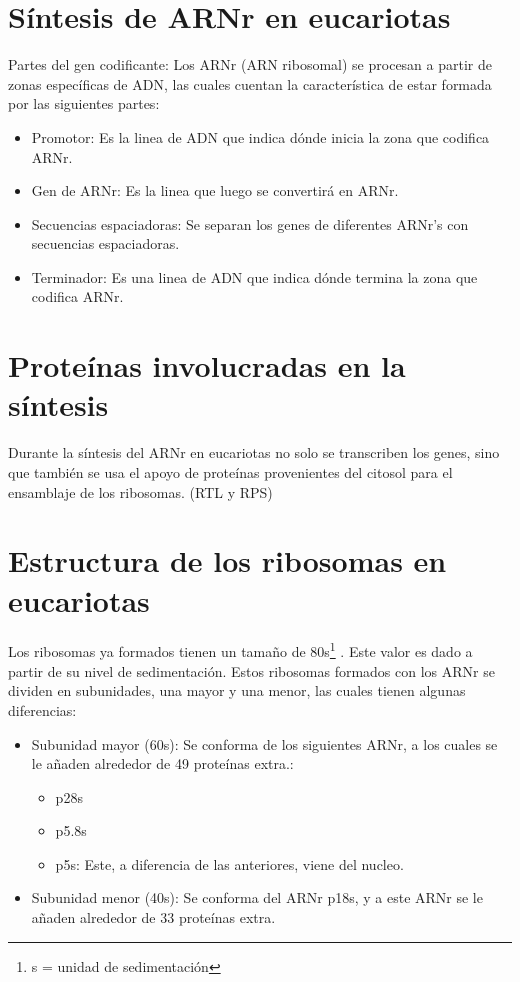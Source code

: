 \section{Síntesis de ARNr en eucariotas}

Partes del gen codificante: Los ARNr (ARN ribosomal) se procesan a partir de zonas específicas de ADN, las cuales cuentan la característica de estar formada por las siguientes partes:

\begin{itemize}
    \item Promotor: Es la linea de ADN que indica dónde inicia la zona que codifica ARNr.
    \item Gen de ARNr: Es la linea que luego se convertirá en ARNr.
    \item Secuencias espaciadoras: Se separan los genes de diferentes ARNr's con secuencias espaciadoras.
    \item Terminador: Es una linea de ADN que indica dónde termina la zona que codifica ARNr.
\end{itemize}

\section{Proteínas involucradas en la síntesis}

Durante la síntesis del ARNr en eucariotas no solo se transcriben los genes, sino que también se usa el apoyo de proteínas provenientes del citosol para el ensamblaje de los ribosomas. (RTL y RPS)

\section{Estructura de los ribosomas en eucariotas}

Los ribosomas ya formados tienen un tamaño de 80s\footnote{s = unidad de sedimentación} . Este valor es dado a partir de su nivel de sedimentación.
Estos ribosomas formados con los ARNr se dividen en subunidades, una mayor y una menor, las cuales tienen algunas diferencias:

\begin{itemize}
    \item Subunidad mayor (60s): Se conforma de los siguientes ARNr, a los cuales se le añaden alrededor de 49 proteínas extra.:
        \begin{itemize}
            \item p28s
            \item p5.8s
            \item p5s: Este, a diferencia de las anteriores, viene del nucleo. 
        \end{itemize} 
        
    \item Subunidad menor (40s): Se conforma del ARNr p18s, y a este ARNr se le añaden alrededor de 33 proteínas extra.
\end{itemize}

